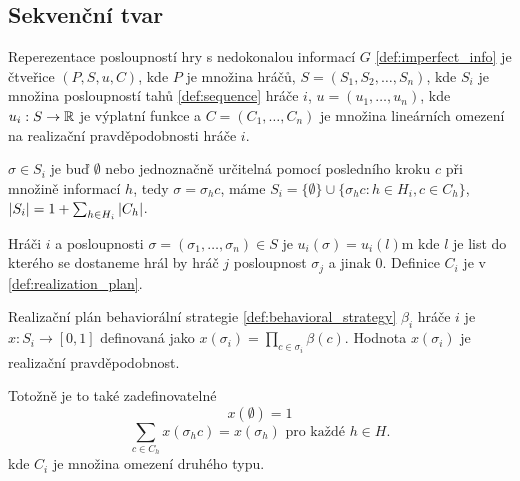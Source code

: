 \subsection{Sekvenční tvar}
\begin{definition}\label{def:sequence_form}
  Reperezentace posloupností hry s nedokonalou informací $G$ \ref{def:imperfect_info} je čtveřice $(P,S,u,C)$, kde $P$ je množina hráčů, $S=(S_1,S_2, \dots,S_n)$, kde $S_i$ je množina posloupností tahů \ref{def:sequence} hráče $i$, $u= (u_1,\dots,u_n)$, kde $u_i : S \rightarrow \mathbb{R}$ je výplatní funkce a $C = (C_1,\dots,C_n)$ je množina lineárních omezení na realizační pravděpodobnosti hráče $i$. 

  $\sigma \in S_i$ je buď $\emptyset$ nebo jednoznačně určitelná pomocí posledního kroku $c$ při množině informací $h$, tedy $\sigma = \sigma_h c$, máme $S_i = \{\emptyset\} \cup \{\sigma_hc:h \in H_i, c\in C_h\}$, $\left|S_i\right| = 1+ \sum_{h \in H_i} \left|C_h\right|$. 

  Hráči $i$ a posloupnosti $\sigma = (\sigma_1, \dots, \sigma_n) \in S$ je $u_i(\sigma) = u_i(l)$m kde $l$ je list do kterého se dostaneme hrál by hráč $j$ posloupnost $\sigma_j$ a jinak 0. 
    Definice $C_i$ je v \ref{def:realization_plan}. 
\end{definition}
\begin{definition}\label{def:realization_plan} 
    Realizační plán behaviorální strategie \ref{def:behavioral_strategy} $\beta_i$ hráče $i$ je $x: S_i \rightarrow [0,1]$ definovaná jako $x(\sigma_i)= \prod_{c\in \sigma_i} \beta(c)$. 
    Hodnota $x(\sigma_i)$ je realizační pravděpodobnost. 

    Totožně je to také zadefinovatelné 
    \[
        x(\emptyset) = 1 
    \]
    \[
        \sum_{c\in C_h} x(\sigma_hc) = x(\sigma_h) \text{ pro každé } h\in H. 
    \]
    kde $C_i$ je množina omezení druhého typu. 
\end{definition}
